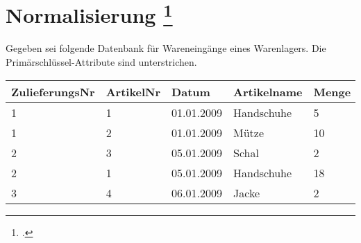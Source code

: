 \documentclass{lehramt-informatik-aufgabe}
\begin{document}
\let\FA=\liFunktionaleAbhaengigkeiten

\section{Normalisierung
\footcite{examen:66116:2012:03}
}

Gegeben sei folgende Datenbank für Wareneingänge eines Warenlagers. Die
Primärschlüssel-Attribute sind unterstrichen.

\begin{center}
\begin{tabular}{|l|l|l|l|l|}
\hline
ZulieferungsNr & ArtikelNr & Datum & Artikelname & Menge\\\hline
1 & 1 & 01.01.2009 & Handschuhe & 5\\\hline
1 & 2 & 01.01.2009 & Mütze & 10\\\hline
2 & 3 & 05.01.2009 & Schal & 2\\\hline
2 & 1 & 05.01.2009 & Handschuhe & 18\\\hline
3 & 4 & 06.01.2009 & Jacke & 2\\\hline
\end{tabular}
\end{center}
\end{document}
